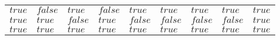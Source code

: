 \begin{sidewaystable}
\begin{tabular}{l|l|l||l|l|l|l|l|l}
    \underline{$true$}                & $false$                          & $true$                           & $false$                      & $true$                            & $true$                            & $true$                           & $true$                      & $true$                                 \\
    \underline{$true$}                & $true$                           & $false$                          & $true$                       & $false$                           & $false$                           & $false$                          & $false$                     & $true$                                 \\
    \underline{$true$}                & $true$                           & $true$                           & $true$                       & $true$                            & $true$                            & $true$                           & $true$                      & $true$                                 \\ \hline
    \end{tabular}
\end{sidewaystable}
